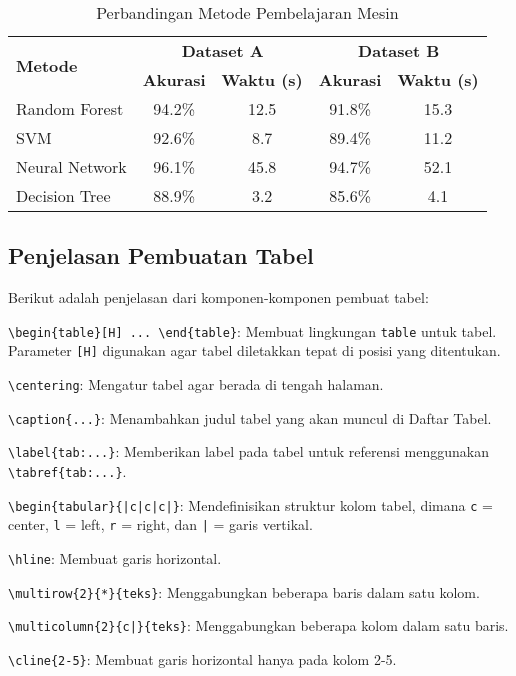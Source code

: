 \begin{table}[H]
    \centering
    \caption{Perbandingan Metode Pembelajaran Mesin}
    \label{tab:perbandingan-metode}
    \begin{tabular}{|l|c|c|c|c|}
        \hline
        \multirow{2}{*}{\textbf{Metode}} & \multicolumn{2}{c|}{\textbf{Dataset A}} & \multicolumn{2}{c|}{\textbf{Dataset B}} \\
        \cline{2-5}
        & \textbf{Akurasi} & \textbf{Waktu (s)} & \textbf{Akurasi} & \textbf{Waktu (s)} \\
        \hline
        Random Forest & 94.2\% & 12.5 & 91.8\% & 15.3 \\
        \hline
        SVM & 92.6\% & 8.7 & 89.4\% & 11.2 \\
        \hline
        Neural Network & 96.1\% & 45.8 & 94.7\% & 52.1 \\
        \hline
        Decision Tree & 88.9\% & 3.2 & 85.6\% & 4.1 \\
        \hline
    \end{tabular}
\end{table}

\subsection{Penjelasan Pembuatan Tabel}
Berikut adalah penjelasan dari komponen-komponen pembuat tabel:

\begin{packed_enum}
    \item \texttt{\textbackslash begin\{table\}[H] ... \textbackslash end\{table\}}: Membuat lingkungan \texttt{table} untuk tabel. Parameter \texttt{[H]} digunakan agar tabel diletakkan tepat di posisi yang ditentukan.
    \item \texttt{\textbackslash centering}: Mengatur tabel agar berada di tengah halaman.
    \item \texttt{\textbackslash caption\{...\}}: Menambahkan judul tabel yang akan muncul di Daftar Tabel.
    \item \texttt{\textbackslash label\{tab:...\}}: Memberikan label pada tabel untuk referensi menggunakan \texttt{\textbackslash tabref\{tab:...\}}.
    \item \texttt{\textbackslash begin\{tabular\}\{|c|c|c|\}}: Mendefinisikan struktur kolom tabel, dimana \texttt{c} = center, \texttt{l} = left, \texttt{r} = right, dan \texttt{|} = garis vertikal.
    \item \texttt{\textbackslash hline}: Membuat garis horizontal.
    \item \texttt{\textbackslash multirow\{2\}\{*\}\{teks\}}: Menggabungkan beberapa baris dalam satu kolom.
    \item \texttt{\textbackslash multicolumn\{2\}\{c|\}\{teks\}}: Menggabungkan beberapa kolom dalam satu baris.
    \item \texttt{\textbackslash cline\{2-5\}}: Membuat garis horizontal hanya pada kolom 2-5.
\end{packed_enum}

